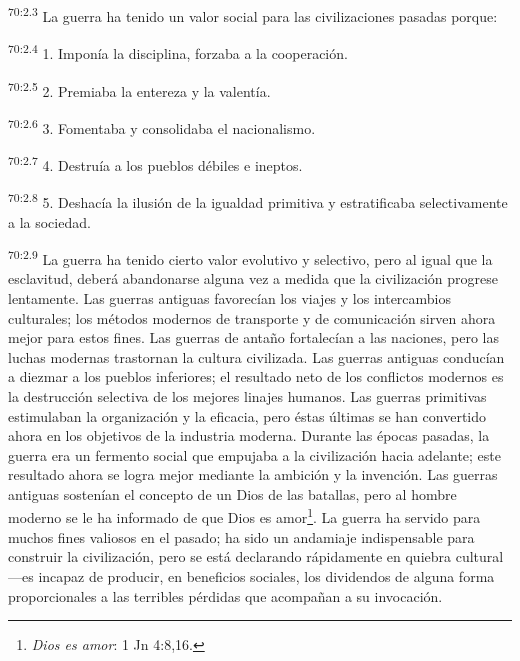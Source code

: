 \par
\textsuperscript{70:2.3} La guerra ha tenido un valor social para las civilizaciones pasadas porque:

\par
\textsuperscript{70:2.4} 1. Imponía la disciplina, forzaba a la cooperación.

\par
\textsuperscript{70:2.5} 2. Premiaba la entereza y la valentía.

\par
\textsuperscript{70:2.6} 3. Fomentaba y consolidaba el nacionalismo.

\par
\textsuperscript{70:2.7} 4. Destruía a los pueblos débiles e ineptos.

\par
\textsuperscript{70:2.8} 5. Deshacía la ilusión de la igualdad primitiva y estratificaba selectivamente a la sociedad.

\par
\textsuperscript{70:2.9} La guerra ha tenido cierto valor evolutivo y selectivo, pero al igual que la esclavitud, deberá abandonarse alguna vez a medida que la civilización progrese lentamente. Las guerras antiguas favorecían los viajes y los intercambios culturales; los métodos modernos de transporte y de comunicación sirven ahora mejor para estos fines. Las guerras de antaño fortalecían a las naciones, pero las luchas modernas trastornan la cultura civilizada. Las guerras antiguas conducían a diezmar a los pueblos inferiores; el resultado neto de los conflictos modernos es la destrucción selectiva de los mejores linajes humanos. Las guerras primitivas estimulaban la organización y la eficacia, pero éstas últimas se han convertido ahora en los objetivos de la industria moderna. Durante las épocas pasadas, la guerra era un fermento social que empujaba a la civilización hacia adelante; este resultado ahora se logra mejor mediante la ambición y la invención. Las guerras antiguas sostenían el concepto de un Dios de las batallas, pero al hombre moderno se le ha informado de que Dios es amor\footnote{\textit{Dios es amor}: 1 Jn 4:8,16.}. La guerra ha servido para muchos fines valiosos en el pasado; ha sido un andamiaje indispensable para construir la civilización, pero se está declarando rápidamente en quiebra cultural ---es incapaz de producir, en beneficios sociales, los dividendos de alguna forma proporcionales a las terribles pérdidas que acompañan a su invocación.

